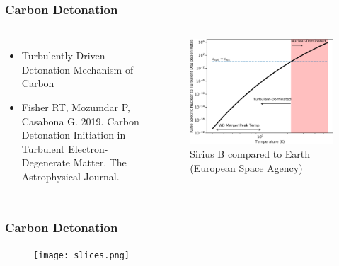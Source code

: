 \documentclass{beamer}
\begin{document}
\begin{frame}
\frametitle{Carbon Detonation}

\begin{columns}[c]
        \begin{itemize}
                \item Turbulently-Driven Detonation Mechanism of Carbon
                \item Fisher RT, Mozumdar P, Casabona G. 2019. Carbon Detonation Initiation in Turbulent Electron-Degenerate Matter. The Astrophysical Journal.
        \end{itemize}


	\vspace{25pt}
        \begin{figure}
    \begin{center}
      \includegraphics[width=.90\linewidth]{carbon_enuc_ration.png}
            \caption{Sirius B compared to Earth (European Space Agency)}
    \end{center}
  \end{figure}

        \end{columns}

\end{frame}


\begin{frame}
\frametitle{Carbon Detonation}

        \begin{figure}
    \begin{center}
      \texttt{[image: slices.png]}
    \end{center}
  \end{figure}


\end{frame}
\end{document}
